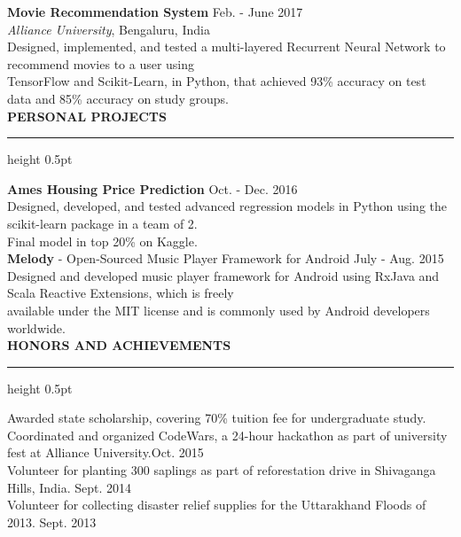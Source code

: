 \documentclass[a4paper]{article}
\newcommand{\myline}{\par
  \kern2pt %
  \hrule height 0.5pt
  \kern2pt %
}
\newcommand{\mybullet}{
	\indent \textbullet \hspace*{2mm}
}
\begin{document}
        \noindent
        \textbf{Movie Recommendation System} \hfill Feb. - June 2017\\
        \textit{Alliance University}, Bengaluru, India \\
        \mybullet Designed, implemented, and tested a multi-layered Recurrent Neural Network 
        to recommend movies to a user using \\ \hspace*{9mm} TensorFlow and Scikit-Learn, 
        in Python, that achieved 93\% accuracy on test data and 85\% accuracy on study groups. \\

	\noindent
	{\large \textbf{PERSONAL PROJECTS}}
	\myline 
	\smallskip
	
	\noindent
	\textbf{Ames Housing Price Prediction} \hfill Oct. - Dec. 2016 \\
	\mybullet Designed, developed, and tested advanced regression models in Python using 
        the scikit-learn package in a team of 2. \\
	\mybullet Final model in top 20\% on Kaggle. \\
	
	\noindent
	\textbf{Melody} - Open-Sourced Music Player Framework for Android \hfill July - Aug. 2015\\
	\mybullet Designed and developed music player framework for Android using RxJava and 
        Scala Reactive Extensions, which is freely\\ \hspace*{9mm} available under the MIT license 
        and is commonly used by Android developers worldwide. \\
	
	\noindent
	{\large \textbf{HONORS AND ACHIEVEMENTS}}
	\myline 
	\smallskip

        \mybullet Awarded state scholarship, covering 70\% tuition fee for undergraduate study. \\
        \mybullet Coordinated and organized CodeWars, a 24-hour hackathon as part of 
        university fest at Alliance University.\hfill Oct. 2015\\
        \mybullet Volunteer for planting 300 saplings as part of reforestation drive in 
        Shivaganga Hills, India. \hfill Sept. 2014 \\
        \mybullet Volunteer for collecting disaster relief supplies for the Uttarakhand Floods 
        of 2013. \hfill Sept. 2013 \\
		
	
\end{document}
